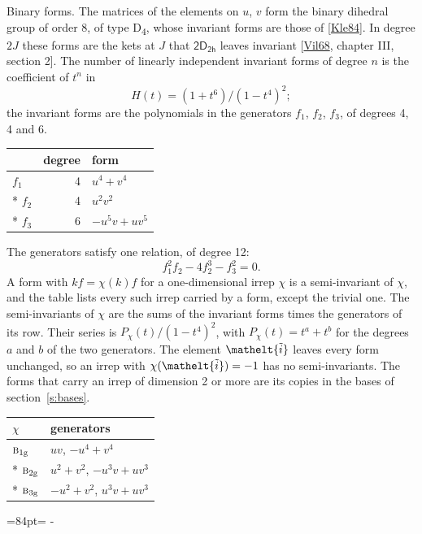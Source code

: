 \documentclass[10pt,a4paper]{article}
\makeatletter
\renewcommand\paragraph{\@startsection{paragraph}{4}{\z@}{1.5ex plus .5ex minus .2ex}{-1em}%
  {\normalfont\small\sffamily\bfseries\color{parttitle}}}
\newcommand{\needspace}[1]{\par\penalty-100\begingroup\dimen0=#1\relax\dimen2=\pagegoal
  \advance\dimen2-\pagetotal\ifdim\dimen0>\dimen2\relax\ifdim\dimen2>0pt\vfil\break\fi\fi
  \endgroup}
\numberwithin{equation}{section}
\newcommand{\eltfont}[1]{{\let\sigma\eltsigma\mathelt{#1}}}
\newcommand{\grp}[1]{\mathsf{#1}}
\newcommand{\irr}[1]{\text{\normalfont\scshape #1}}
\newcommand{\elt}[1]{\eltfont{#1}}
\newcommand{\ptag}[1]{\mathrm{#1}}
\newcommand{\lift}[1]{\tilde{#1}}
\makeatother
\begin{document}
\paragraph{Binary forms.}
The matrices of the elements on $u$, $v$ form the binary dihedral group of order 8, of type D\textsubscript{4}, whose invariant forms are those of [\href{../../../REFERENCES.pdf\#ref.Kle84}{Kle84}]. In degree $2J$ these forms are the kets at $J$ that $\grp{2D_{2h}}$ leaves invariant [\href{../../../REFERENCES.pdf\#ref.Vil68}{Vil68}, chapter III, section 2]. \label{n:head.degree}\label{n:head.form}The number of linearly independent invariant forms of degree $n$ is the coefficient of $t^n$ in
\begin{equation}\label{e:molien}H(t) = (1 + t^{6})/(1-t^{4})^{2};\end{equation}
the invariant forms are the polynomials in the generators $f_1$, $f_2$, $f_3$, of degrees 4, 4 and 6.
{\small\begin{longtable}{@{}lrl@{}}\toprule
& degree & form\\\midrule\endhead
\bottomrule\endfoot\endlastfoot
$f_{1}$ & 4 & $u^{4} + v^{4}$\\*
$f_{2}$ & 4 & $u^{2}v^{2}$\\*
$f_{3}$ & 6 & $-u^{5}v + uv^{5}$\\
\bottomrule\end{longtable}}
The generators satisfy one relation, of degree 12:
\begin{equation}\label{e:relation}f_{1}^{2}f_{2} - 4f_{2}^{3} - f_{3}^{2} = 0.\end{equation}
A form with $k f = \chi(k) f$ for a one-dimensional irrep $\chi$ is a semi-invariant of $\chi$, and the table lists every such irrep carried by a form, except the trivial one. \label{n:head.generators}The semi-invariants of $\chi$ are the sums of the invariant forms times the generators of its row. Their series is $P_\chi(t)/(1-t^{4})^{2}$, with $P_\chi(t) = t^{a} + t^{b}$ for the degrees $a$ and $b$ of the two generators. The element $\elt{\lift{i}}$ leaves every form unchanged, so an irrep with $\chi(\elt{\lift{i}}) = -1$ has no semi-invariants. The forms that carry an irrep of dimension 2 or more are its copies in the bases of section~\ref{s:bases}.
{\small\begin{longtable}{@{}ll@{}}\toprule
$\chi$ & generators\\\midrule\endhead
\bottomrule\endfoot\endlastfoot
$\irr{b}_{1\ptag{g}}$ & $uv$, $-u^{4} + v^{4}$\\*
$\irr{b}_{2\ptag{g}}$ & $u^{2} + v^{2}$, $-u^{3}v + uv^{3}$\\*
$\irr{b}_{3\ptag{g}}$ & $-u^{2} + v^{2}$, $u^{3}v + uv^{3}$\\
\bottomrule\end{longtable}}
\needspace{84pt}
\end{document}
